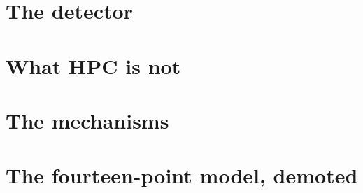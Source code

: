 \section{The detector}

%
%
%

\section{What HPC is not}

%
%

\section{The mechanisms}

%
%

\section{The fourteen-point model, demoted}

